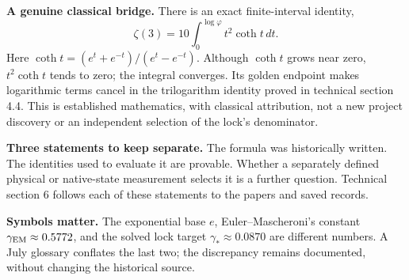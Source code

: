 \documentclass[11pt,a4paper]{article}
\begin{document}
\medskip
\noindent\textbf{A genuine classical bridge.}
There is an exact finite-interval identity,
\[
\boxed{\zeta(3)=10\int_0^{\log\varphi}t^2\coth t\,dt.}
\]
Here $\coth t=(e^t+e^{-t})/(e^t-e^{-t})$.
Although $\coth t$ grows near zero, $t^2\coth t$ tends to zero;
the integral converges. Its golden endpoint makes logarithmic
terms cancel in the trilogarithm identity proved in technical section 4.4.
This is established mathematics, with classical attribution,
not a new project discovery or an independent selection of the lock's
denominator.

\medskip
\noindent\textbf{Three statements to keep separate.}
The formula was historically written. The identities used to evaluate it
are provable. Whether a separately defined physical or native-state
measurement selects it is a further question.
Technical section 6 follows each of these statements to the papers and saved records.

\medskip
\noindent\textbf{Symbols matter.}
The exponential base $e$, Euler--Mascheroni's constant
$\gamma_{\rm EM}\approx0.5772$, and the solved lock target
$\gamma_*\approx0.0870$ are different numbers.
A July glossary conflates the last two; the discrepancy remains documented,
without changing the historical source.
\clearpage
\end{document}
